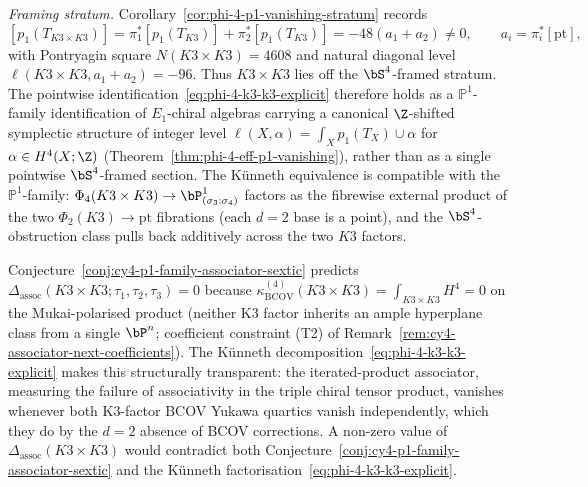 \begin{remark}
\noindent\textit{Framing stratum.} Corollary~\textup{\ref{cor:phi-4-p1-vanishing-stratum}} records
\[
 [p_1(T_{K3 \times K3})]
 =
 \pi_1^*[p_1(T_{K3})]+\pi_2^*[p_1(T_{K3})]
 =
 -48(a_1+a_2)
 \neq 0,
 \qquad a_i=\pi_i^*[\mathrm{pt}],
\]
with Pontryagin square \(N(K3\times K3)=4608\) and natural diagonal level
\(\ell(K3\times K3,a_1+a_2)=-96\). Thus \(K3 \times K3\) lies off the
\(\bS^4\)-framed stratum. The pointwise identification~\eqref{eq:phi-4-k3-k3-explicit} therefore holds as a $\mathbb{P}^1$-family identification of $E_1$-chiral algebras carrying a canonical $\Z$-shifted symplectic structure of integer level $\ell(X, \alpha) = \int_X p_1(T_X) \cup \alpha$ for $\alpha \in H^4(X; \Z)$ (Theorem~\textup{\ref{thm:phi-4-eff-p1-vanishing}}), rather than as a single pointwise $\bS^4$-framed section. The K\"unneth equivalence is compatible with the $\mathbb{P}^1$-family: $\Phi_4(K3 \times K3) \to \bP^1_{(\sigma_3:\sigma_4)}$ factors as the fibrewise external product of the two $\Phi_2(K3) \to \mathrm{pt}$ fibrations (each $d = 2$ base is a point), and the $\bS^4$-obstruction class pulls back additively across the two $K3$ factors.
\end{remark}

\begin{remark}
\label{rem:phi-4-k3-k3-assoc-vanishing}
%
Conjecture~\textup{\ref{conj:cy4-p1-family-associator-sextic}} predicts $\Delta_{\mathrm{assoc}}(K3 \times K3; \tau_1, \tau_2, \tau_3) = 0$ because $\kappa_{\mathrm{BCOV}}^{(4)}(K3 \times K3) = \int_{K3 \times K3} H^4 = 0$ on the Mukai-polarised product (neither K$3$ factor inherits an ample hyperplane class from a single $\bP^n$; coefficient constraint \textup{(T2)} of Remark~\textup{\ref{rem:cy4-associator-next-coefficients}}). The K\"unneth decomposition~\eqref{eq:phi-4-k3-k3-explicit} makes this structurally transparent: the iterated-product associator, measuring the failure of associativity in the triple chiral tensor product, vanishes whenever both K$3$-factor BCOV Yukawa quartics vanish independently, which they do by the $d = 2$ absence of BCOV corrections. A non-zero value of $\Delta_{\mathrm{assoc}}(K3 \times K3)$ would contradict both Conjecture~\textup{\ref{conj:cy4-p1-family-associator-sextic}} and the K\"unneth factorisation~\eqref{eq:phi-4-k3-k3-explicit}.
\end{remark}

